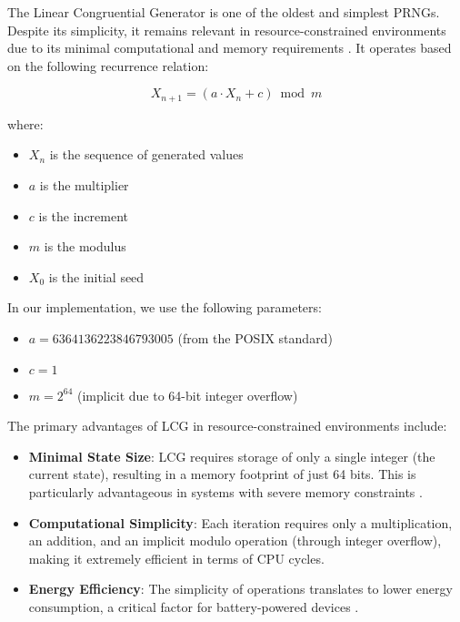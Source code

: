 The Linear Congruential Generator is one of the oldest and simplest PRNGs. Despite its simplicity, it remains relevant in resource-constrained environments due to its minimal computational and memory requirements \cite{prng_iot}. It operates based on the following recurrence relation:

\begin{equation}
X_{n+1} = (a \cdot X_n + c) \bmod m
\end{equation}

where:
\begin{itemize}
    \item $X_n$ is the sequence of generated values
    \item $a$ is the multiplier
    \item $c$ is the increment
    \item $m$ is the modulus
    \item $X_0$ is the initial seed
\end{itemize}

In our implementation, we use the following parameters:
\begin{itemize}
    \item $a = 6364136223846793005$ (from the POSIX standard)
    \item $c = 1$
    \item $m = 2^{64}$ (implicit due to 64-bit integer overflow)
\end{itemize}

The primary advantages of LCG in resource-constrained environments include:

\begin{itemize}
    \item \textbf{Minimal State Size}: LCG requires storage of only a single integer (the current state), resulting in a memory footprint of just 64 bits. This is particularly advantageous in systems with severe memory constraints \cite{embedded_prng}.
    
    \item \textbf{Computational Simplicity}: Each iteration requires only a multiplication, an addition, and an implicit modulo operation (through integer overflow), making it extremely efficient in terms of CPU cycles.
    
    \item \textbf{Energy Efficiency}: The simplicity of operations translates to lower energy consumption, a critical factor for battery-powered devices \cite{prng_iot}.
\end{itemize}

